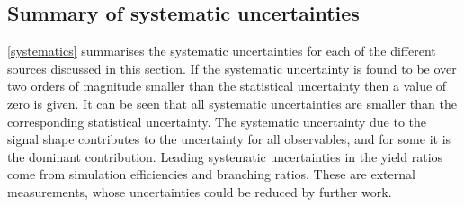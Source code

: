 \subsection{Summary of systematic uncertainties}

\Tab\ref{systematics} summarises the systematic uncertainties for each of the different sources discussed in this section. If the systematic uncertainty is found to be over two orders of magnitude smaller than the statistical uncertainty then a value of zero is given. It can be seen that all systematic uncertainties are smaller than the corresponding statistical uncertainty. The systematic uncertainty due to the signal shape contributes to the uncertainty for all \CP observables, and for some it is the dominant contribution. Leading systematic uncertainties in the yield ratios come from simulation efficiencies and branching ratios. These are external measurements, whose uncertainties could be reduced by further work.


